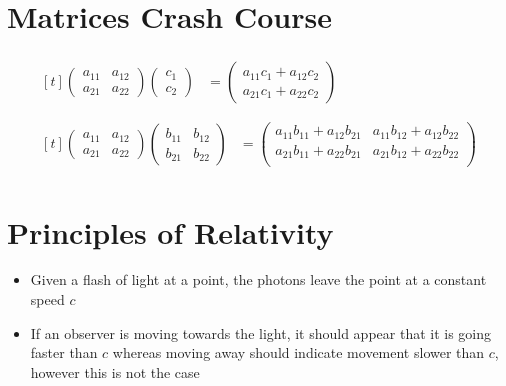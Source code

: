\documentclass[12pt,letterpaper, twocolumn]{article}
\begin{document}
\section{Matrices Crash Course}
\begin{align*}
    \begin{multlined}[t]
    \begin{pmatrix}
        a_{11} & a_{12} \\
        a_{21} & a_{22} 
      \end{pmatrix}
      \begin{pmatrix}
        c_1\\c_2
      \end{pmatrix} &=
      \begin{pmatrix}
        a_{11}c_1+a_{12}c_2\\
        a_{21}c_1+a_{22}c_2
      \end{pmatrix}
    \end{multlined}
      \\\\
      \begin{multlined}[t]
      \begin{pmatrix}
        a_{11} & a_{12} \\
        a_{21} & a_{22} 
      \end{pmatrix}
      \begin{pmatrix}
        b_{11} & b_{12} \\
        b_{21} & b_{22} 
      \end{pmatrix} &=
      \begin{pmatrix}
        a_{11}b_{11} + a_{12}b_{21} & a_{11}b_{12} + a_{12}b_{22} \\
        a_{21}b_{11} + a_{22}b_{21} & a_{21}b_{12} + a_{22}b_{22} \\
      \end{pmatrix}
    \end{multlined}
\end{align*}

\section{Principles of Relativity}
\begin{itemize}
    \item Given a flash of light at a point, the photons leave the point at a constant speed $c$
    \item If an observer is moving towards the light, it should appear that it is going faster than $c$ whereas moving away should indicate movement slower than $c$, however this is not the case 
\end{itemize}
\end{document}
